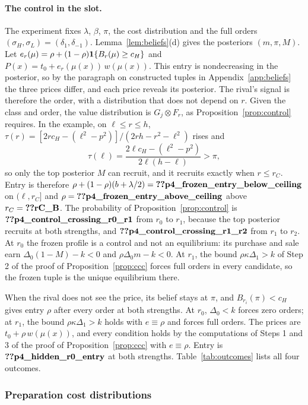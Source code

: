 \paragraph{The control in the slot.}
The experiment fixes \(\lambda\), \(\beta\), \(\pi\), the cost distribution and the full orders
\((\sigma_H,\sigma_L)=(\delta_1,\delta_{-1})\). Lemma~\ref{lem:beliefs}(d) gives the posteriors \((m,\pi,M)\). Let
\(e_r(\mu)=\rho+(1-\rho)\mathbf{1}\{B_r(\mu)\ge c_H\}\) and \(P(x)=t_0+e_r(\mu(x))\,w(\mu(x))\). This entry is nondecreasing
in the posterior, so by the paragraph on constructed tuples in Appendix~\ref{app:beliefs} the three prices differ,
and each price reveals its posterior. The rival's signal is therefore the order, with a distribution that does not
depend on \(r\). Given the class and order, the value distribution is \(G_j\otimes F_r\), as Proposition~\ref{prop:control} requires.
In the example, on \(\ell\le r\le h\), \(\tau(r)=[2r c_H-(\ell^2-p^2)]/(2rh-r^2-\ell^2)\) rises and
\[
\tau(\ell)=\frac{2\ell c_H-(\ell^2-p^2)}{2\ell(h-\ell)}>\pi,
\]
so only the top posterior \(M\) can recruit, and it recruits exactly when \(r\le r_C\). Entry is therefore
\(\rho+(1-\rho)(b+\lambda/2)=\reg{p4_frozen_entry_below_ceiling}\) on \((\ell,r_C]\) and
\(\rho=\reg{p4_frozen_entry_above_ceiling}\) above \(r_C=\reg{rC_B}\). The probability of
Proposition~\ref{prop:control} is \(\reg{p4_control_crossing_r0_r1}\) from \(r_0\) to \(r_1\), because the top posterior
recruits at both strengths, and \(\reg{p4_control_crossing_r1_r2}\) from \(r_1\) to \(r_2\). At \(r_0\) the frozen profile
is a control and not an equilibrium: its purchase and sale earn \(\Delta_0(1-M)-k<0\) and \(\rho\Delta_0m-k<0\). At
\(r_1\), the bound \(\rho\kappa\Delta_1>k\) of Step 2 of the proof of Proposition~\ref{prop:ccc} forces full orders
in every candidate, so the frozen tuple is the unique equilibrium there.

When the rival does not see the price, its belief stays at \(\pi\), and \(B_{r_i}(\pi)<c_H\) gives entry
\(\rho\) after every order at both strengths. At \(r_0\), \(\Delta_0<k\) forces zero orders; at \(r_1\), the bound
\(\rho\kappa\Delta_1>k\) holds with \(e\equiv\rho\) and forces full orders. The prices are
\(t_0+\rho\,w(\mu(x))\), and every condition holds by the computations of Steps 1 and 3 of the proof of
Proposition~\ref{prop:ccc} with \(e\equiv\rho\). Entry is \(\reg{p4_hidden_r0_entry}\) at both strengths.
Table~\ref{tab:outcomes} lists all four outcomes.

\subsubsection*{Preparation cost distributions}


